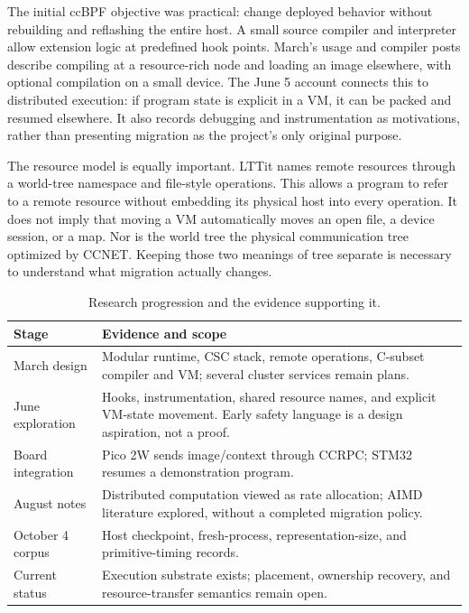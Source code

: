 \documentclass[conference,letterpaper]{IEEEtran}
\begin{document}
The initial ccBPF objective was practical: change deployed behavior without rebuilding and reflashing the entire host. A small source compiler and interpreter allow extension logic at predefined hook points. March's usage and compiler posts describe compiling at a resource-rich node and loading an image elsewhere, with optional compilation on a small device. The June 5 account connects this to distributed execution: if program state is explicit in a VM, it can be packed and resumed elsewhere. It also records debugging and instrumentation as motivations, rather than presenting migration as the project's only original purpose.

The resource model is equally important. LTTit names remote resources through a world-tree namespace and file-style operations. This allows a program to refer to a remote resource without embedding its physical host into every operation. It does not imply that moving a VM automatically moves an open file, a device session, or a map. Nor is the world tree the physical communication tree optimized by CCNET. Keeping those two meanings of tree separate is necessary to understand what migration actually changes.

\begin{table}[t]
\caption{Research progression and the evidence supporting it.}
\centering\small
\begin{tabular}{@{}>{\raggedright\arraybackslash}p{}>{\raggedright\arraybackslash}p{}@{}}
\toprule
Stage & Evidence and scope\\\midrule
March design & Modular runtime, CSC stack, remote operations, C-subset compiler and VM; several cluster services remain plans.\\
June exploration & Hooks, instrumentation, shared resource names, and explicit VM-state movement. Early safety language is a design aspiration, not a proof.\\
Board integration & Pico 2W sends image/context through CCRPC; STM32 resumes a demonstration program.\\
August notes & Distributed computation viewed as rate allocation; AIMD literature explored, without a completed migration policy.\\
October 4 corpus & Host checkpoint, fresh-process, representation-size, and primitive-timing records.\\
Current status & Execution substrate exists; placement, ownership recovery, and resource-transfer semantics remain open.\\\bottomrule
\end{tabular}
\end{table}
\end{document}

